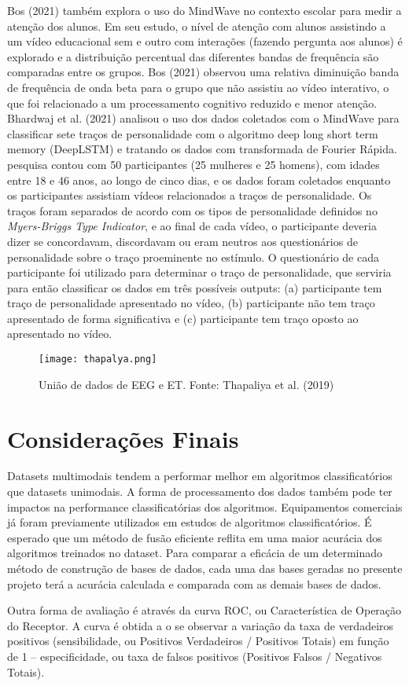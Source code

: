 Bos (2021) também explora o uso do MindWave no contexto escolar para medir a atenção dos alunos. Em seu estudo, 
o nível de atenção com alunos assistindo a um vídeo educacional sem e outro com interações (fazendo pergunta aos alunos)
 é explorado e a distribuição percentual das diferentes bandas de frequência são comparadas entre os grupos. Bos (2021) 
 observou uma relativa diminuição banda de frequência de onda beta para o grupo que não assistiu ao vídeo interativo, 
 o que foi relacionado a um processamento cognitivo reduzido e menor atenção.
Bhardwaj et al. (2021) analisou o uso dos dados coletados com o MindWave para classificar sete traços de personalidade 
com o algoritmo deep long short term memory (DeepLSTM) e tratando os dados com transformada de Fourier Rápida. 
 pesquisa contou com 50 participantes (25 mulheres e 25 homens), com idades entre 18 e 46 anos, ao longo de cinco dias, 
 e os dados foram coletados enquanto os participantes assistiam vídeos relacionados a traços de personalidade. 
 Os traços foram separados de acordo com os tipos de personalidade definidos no \textit{Myers-Briggs Type Indicator}, 
 e ao final de cada vídeo, o participante deveria dizer se concordavam, 
 discordavam ou eram neutros aos questionários de personalidade sobre o traço proeminente no estímulo. 
 O questionário de cada participante foi utilizado para determinar o traço de personalidade, 
 que serviria para então classificar os dados em três possíveis outputs: 
 (a) participante tem traço de personalidade apresentado no vídeo, (b) participante não tem traço apresentado de forma significativa 
 e (c) participante tem traço oposto ao apresentado no vídeo. 


\begin{figure}
      \centering
      \texttt{[image: thapalya.png]}
      \caption{União de dados de EEG e ET. Fonte: Thapaliya et al. (2019)}
\end{figure}



\section{Considerações Finais}
Datasets multimodais tendem a performar melhor em algoritmos classificatórios que datasets unimodais. 
A forma de processamento dos dados também pode ter impactos na performance classificatórias dos algoritmos. 
Equipamentos comerciais já foram previamente utilizados em estudos de algoritmos classificatórios. 
É esperado que um método de fusão eficiente reflita em uma maior acurácia dos algoritmos treinados no dataset. 
Para comparar a eficácia de um determinado método de construção de bases de dados, 
cada uma das bases geradas no presente projeto terá a acurácia calculada e comparada com as demais bases de dados.





Outra forma de avaliação é através da curva ROC, 
ou Característica de Operação do Receptor. A curva é obtida a
o se observar a variação da taxa de verdadeiros positivos (sensibilidade, ou Positivos Verdadeiros / Positivos Totais) em função de 1 – 
especificidade, ou taxa de falsos positivos (Positivos Falsos / Negativos Totais). 
